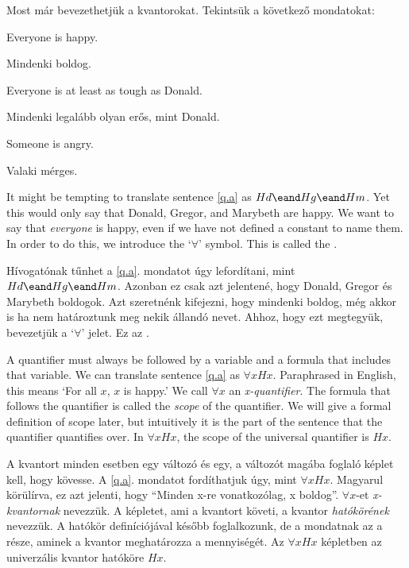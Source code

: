 Most már bevezethetjük a kvantorokat. Tekintsük a következő mondatokat:

\begin{earg}
\item[\ex{q.a}] Everyone is happy.
\item[\ex{q.a}] Mindenki boldog.
\item[\ex{q.ac}] Everyone is at least as tough as Donald.
\item[\ex{q.ac}] Mindenki legalább olyan erős, mint Donald.
\item[\ex{q.e}] Someone is angry.
\item[\ex{q.e}] Valaki mérges.
\end{earg}

It might be tempting to translate sentence \ref{q.a} as $Hd \eand Hg \eand Hm$. Yet this would only say that Donald, Gregor, and Marybeth are happy. We want to say that \emph{everyone} is happy, even if we have not defined a constant to name them. In order to do this, we introduce the `$\forall$' symbol. This is called the .

Hívogatónak tűnhet a \ref{q.a}. mondatot úgy lefordítani, mint $Hd \eand Hg \eand Hm$. Azonban ez csak azt jelentené, hogy Donald, Gregor és Marybeth boldogok. Azt szeretnénk kifejezni, hogy mindenki boldog, még akkor is ha nem határoztunk meg nekik állandó nevet. Ahhoz, hogy ezt megtegyük, bevezetjük a `$\forall$' jelet. Ez az .

A quantifier must always be followed by a variable and a formula that includes that variable. We can translate sentence \ref{q.a} as $\forall x Hx$. Paraphrased in English, this means `For all $x$, $x$ is happy.'
We call $\forall x$ an \emph{x-quantifier}. The formula that follows the quantifier is called the \emph{scope} of the quantifier. We will give a formal definition of scope later, but intuitively it is the part of the sentence that the quantifier quantifies over. In $\forall x Hx$, the scope of the universal quantifier is $Hx$.

A kvantort minden esetben egy változó és egy, a változót magába foglaló képlet kell, hogy kövesse. A \ref{q.a}. mondatot fordíthatjuk úgy, mint $\forall x Hx$. Magyarul körülírva, ez azt jelenti, hogy “Minden x-re vonatkozólag, x boldog”. $\forall x$-et \emph{x-kvantornak} nevezzük. A képletet, ami a kvantort követi, a kvantor \emph{hatókörének} nevezzük. A hatókör definíciójával később foglalkozunk, de a mondatnak az a része, aminek a kvantor meghatározza a mennyiségét. Az $\forall x Hx$ képletben az univerzális kvantor hatóköre $Hx$.


